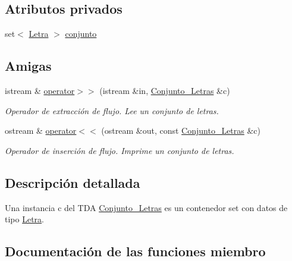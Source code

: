 \subsection*{Atributos privados}
\begin{DoxyCompactItemize}
\item 
set$<$ \hyperlink{classLetra}{Letra} $>$ \hyperlink{classConjunto__Letras_a9b9b3e1c3fd227d0fe961769f5e05894}{conjunto}
\end{DoxyCompactItemize}
\subsection*{Amigas}
\begin{DoxyCompactItemize}
\item 
istream \& \hyperlink{classConjunto__Letras_abf08384cdc42718a16ac3604ddd954cf}{operator$>$$>$} (istream \&in, \hyperlink{classConjunto__Letras}{Conjunto\+\_\+\+Letras} \&c)
\begin{DoxyCompactList}\small\item\em Operador de extracción de flujo. Lee un conjunto de letras. \end{DoxyCompactList}\item 
ostream \& \hyperlink{classConjunto__Letras_abec73eba28c0f57dc3255e8e53a01e07}{operator$<$$<$} (ostream \&out, const \hyperlink{classConjunto__Letras}{Conjunto\+\_\+\+Letras} \&c)
\begin{DoxyCompactList}\small\item\em Operador de inserción de flujo. Imprime un conjunto de letras. \end{DoxyCompactList}\end{DoxyCompactItemize}


\subsection{Descripción detallada}
Una instancia c del T\+DA \hyperlink{classConjunto__Letras}{Conjunto\+\_\+\+Letras} es un contenedor set con datos de tipo \hyperlink{classLetra}{Letra}. 

\subsection{Documentación de las funciones miembro}
\mbox{\label{classConjunto__Letras_aaefd083db74ab48e49f747dd47147e02}} 
